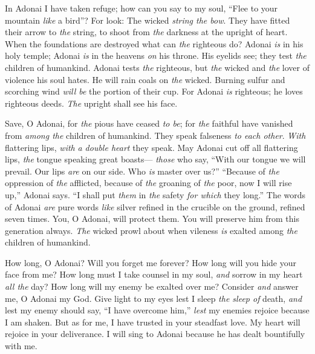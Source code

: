 \begin{biblechapter} %
 In Adonai I have taken refuge; 
how can you say to my soul, 
“Flee to your mountain \textit{like} a bird”?
\verse For look: The wicked \textit{string the bow}. 
They have fitted their arrow to \textit{the} string, 
to shoot from \textit{the} darkness 
at the upright of heart.
\verse When the foundations are destroyed 
what can \textit{the} righteous do?
\verse Adonai \textit{is} in his holy temple; 
Adonai \textit{is} in the heavens \textit{on} his throne. 
His eyelids see; 
they test \textit{the} children of humankind.
\verse Adonai tests \textit{the} righteous, 
but \textit{the} wicked and \textit{the} lover of violence 
his soul hates.
\verse He will rain coals on \textit{the} wicked. 
Burning sulfur and scorching wind 
\textit{will be} the portion of their cup.
\verse For Adonai \textit{is} righteous; 
he loves righteous deeds. 
\textit{The} upright shall see his face.
\end{biblechapter}

\begin{biblechapter} %
 Save, O Adonai, for \textit{the} pious have ceased \textit{to be}; 
for \textit{the} faithful have vanished 
from \textit{among the} children of humankind.
\verse They speak falseness \textit{to each other}. 
\textit{With} flattering lips, 
\textit{with} \textit{a double heart} they speak.
\verse May Adonai cut off all flattering lips, 
\textit{the} tongue speaking great boasts—
\verse \textit{those} who say, “With our tongue we will prevail. 
Our lips \textit{are} on our side. 
Who \textit{is} master over us?”
\verse “Because of \textit{the} oppression of \textit{the} afflicted, 
because of \textit{the} groaning of \textit{the} poor, 
now I will rise up,” Adonai says. 
“I shall put \textit{them} in \textit{the} safety \textit{for which} they long.”
\verse The words of Adonai \textit{are} pure words 
\textit{like} silver refined in the crucible on the ground, 
refined seven times.
\verse You, O Adonai, will protect them. 
You will preserve him 
from this generation always.
\verse \textit{The} wicked prowl about 
when vileness \textit{is} exalted among \textit{the} children of humankind.
\end{biblechapter}

\begin{biblechapter} %
 How long, O Adonai? Will you forget me forever? 
How long will you hide your face from me?
\verse How long must I take counsel in my soul, 
\textit{and} sorrow in my heart \textit{all the} day? 
How long will my enemy be exalted over me?
\verse Consider \textit{and} answer me, O Adonai my God. 
Give light to my eyes 
lest I sleep \textit{the sleep of} death,
\verse \textit{and} lest my enemy should say, “I have overcome him,” 
\textit{lest} my enemies rejoice because I am shaken.
\verse But as for me, I have trusted in your steadfast love. 
My heart will rejoice in your deliverance.
\verse  I will sing to Adonai 
because he has dealt bountifully with me.
\end{biblechapter}

